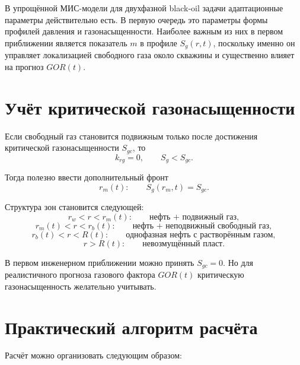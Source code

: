 \documentclass[12pt,a4paper]{article}
\begin{document}
В упрощённой МИС-модели для двухфазной black-oil задачи адаптационные параметры действительно есть. В первую очередь это параметры формы профилей давления и газонасыщенности. Наиболее важным из них в первом приближении является показатель $m$ в профиле $S_g(r,t)$, поскольку именно он управляет локализацией свободного газа около скважины и существенно влияет на прогноз $GOR(t)$.

\section{Учёт критической газонасыщенности}

Если свободный газ становится подвижным только после достижения критической газонасыщенности $S_{gc}$, то
\begin{equation}
    k_{rg}=0, \qquad S_g<S_{gc}.
\end{equation}

Тогда полезно ввести дополнительный фронт
\begin{equation}
    r_m(t): \qquad S_g(r_m,t)=S_{gc}.
\end{equation}

Структура зон становится следующей:
\begin{equation}
    r_w<r<r_m(t):
    \qquad
    \text{нефть + подвижный газ},
\end{equation}
\begin{equation}
    r_m(t)<r<r_b(t):
    \qquad
    \text{нефть + неподвижный свободный газ},
\end{equation}
\begin{equation}
    r_b(t)<r<R(t):
    \qquad
    \text{однофазная нефть с растворённым газом},
\end{equation}
\begin{equation}
    r>R(t):
    \qquad
    \text{невозмущённый пласт}.
\end{equation}

В первом инженерном приближении можно принять $S_{gc}=0$. Но для реалистичного прогноза газового фактора $GOR(t)$ критическую газонасыщенность желательно учитывать.

\section{Практический алгоритм расчёта}

Расчёт можно организовать следующим образом:
\end{document}
